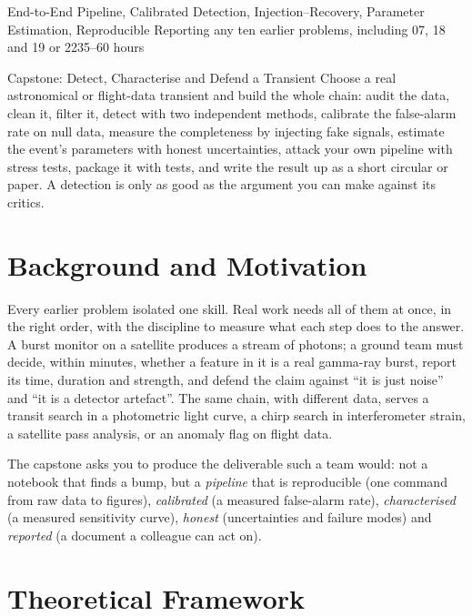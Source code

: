 \documentclass[11pt,a4paper]{article}
\begin{document}
%
{End-to-End Pipeline, Calibrated Detection, Injection--Recovery, Parameter Estimation, Reproducible Reporting}%
{any ten earlier problems, including 07, 18 and 19 or 22}{35--60 hours}

\begin{summarybox}{Capstone: Detect, Characterise and Defend a Transient}
Choose a real astronomical or flight-data transient and build the whole chain: audit the data, clean it, filter it, detect with two independent methods, calibrate the false-alarm rate on null data, measure the completeness by injecting fake signals, estimate the event's parameters with honest uncertainties, attack your own pipeline with stress tests, package it with tests, and write the result up as a short circular or paper. A detection is only as good as the argument you can make against its critics.
\end{summarybox}


\section*{Background and Motivation}
Every earlier problem isolated one skill. Real work needs all of them at once, in the right order, with the discipline to measure what each step does to the answer. A burst monitor on a satellite produces a stream of photons; a ground team must decide, within minutes, whether a feature in it is a real gamma-ray burst, report its time, duration and strength, and defend the claim against ``it is just noise'' and ``it is a detector artefact''. The same chain, with different data, serves a transit search in a photometric light curve, a chirp search in interferometer strain, a satellite pass analysis, or an anomaly flag on flight data.

The capstone asks you to produce the deliverable such a team would: not a notebook that finds a bump, but a \emph{pipeline} that is reproducible (one command from raw data to figures), \emph{calibrated} (a measured false-alarm rate), \emph{characterised} (a measured sensitivity curve), \emph{honest} (uncertainties and failure modes) and \emph{reported} (a document a colleague can act on).

\section*{Theoretical Framework}
\end{document}
